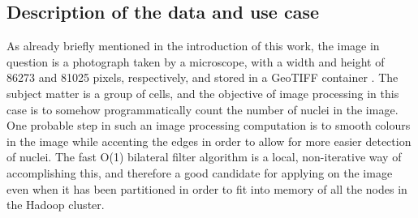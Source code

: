 \documentclass [12pt,a4paper]{report}
\begin{document}
\subsection{Description of the data and use case}

As already briefly mentioned in the introduction of this work, the image in question is a photograph taken by a microscope, with a width and height of 86273 and 81025 pixels, respectively, and stored in a GeoTIFF container \cite{mahammad2003geotiff}. The subject matter is a group of cells, and the objective of image processing in this case is to somehow programmatically count the number of nuclei in the image. One probable step in such an image processing computation is to smooth colours in the image while accenting the edges in order to allow for more easier detection of nuclei. The fast O(1) bilateral filter algorithm is a local, non-iterative way of accomplishing this, and therefore a good candidate for applying on the image even when it has been partitioned in order to fit into memory of all the nodes in the Hadoop cluster.
\end{document}
